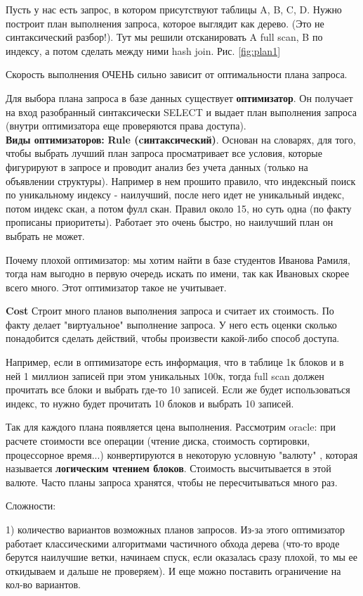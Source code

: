 Пусть у нас есть запрос, в котором присутствуют таблицы A, B, C, D. Нужно построит план выполнения запроса, которое выглядит как дерево. (Это не синтаксический разбор!). Тут мы решили отсканировать A full scan, B по индексу, а потом сделать между ними hash join. Рис. \ref{fig:plan1}

Скорость выполнения ОЧЕНЬ сильно зависит от оптимальности плана запроса.


Для выбора плана запроса в базе данных существует \textbf{оптимизатор}. Он получает на вход разобранный синтаксически SELECT и выдает план выполнения запроса (внутри оптимизатора еще проверяются права доступа). 
\\[10pt]
\textbf{Виды оптимизаторов:} 
\textbf{Rule (cинтаксический)}. Основан на словарях, для того, чтобы выбрать лучший план запроса просматривает все условия, которые фигурируют в запросе и проводит анализ без учета данных (только на объявлении структуры). Например в нем прошито правило, что индексный поиск по уникальному индексу - наилучший, после него идет не уникальный индекс, потом индекс скан, а потом фулл скан. Правил около 15, но суть одна (по факту прописаны приоритеты). Работает это очень быстро, но наилучший план он выбрать не может.

Почему плохой оптимизатор: мы хотим найти в базе студентов Иванова Рамиля, тогда нам выгодно в первую очередь искать по имени, так как Ивановых скорее всего много. Этот оптимизатор такое не учитывает. 

\textbf{Cost} Строит много планов выполнения запроса и считает их стоимость. По факту делает "виртуальное" выполнение запроса. У него есть оценки сколько понадобится сделать действий, чтобы произвести какой-либо способ доступа. 

Например, если в оптимизаторе есть информация, что в таблице 1к блоков и в ней 1 миллион записей при этом уникальных 100к, тогда full scan должен прочитать все блоки и выбрать где-то 10 записей. Если же будет использоваться индекс, то нужно будет прочитать 10 блоков и выбрать 10 записей. 

Так для каждого плана появляется цена выполнения. Рассмотрим oracle: при расчете стоимости все операции (чтение диска, стоимость сортировки, процессорное время...) конвертируются в некоторую условную "валюту" , которая называется \textbf{логическим чтением блоков}. Стоимость высчитывается в этой валюте. Часто планы запроса хранятся, чтобы не пересчитываться много раз. 

Сложности: 

1) количество вариантов возможных планов запросов. Из-за этого оптимизатор работает классическими алгоритмами частичного обхода дерева (что-то вроде берутся наилучшие ветки, начинаем спуск, если оказалась сразу плохой, то мы ее откидываем и дальше не проверяем). И еще можно поставить ограничение на кол-во вариантов. 

